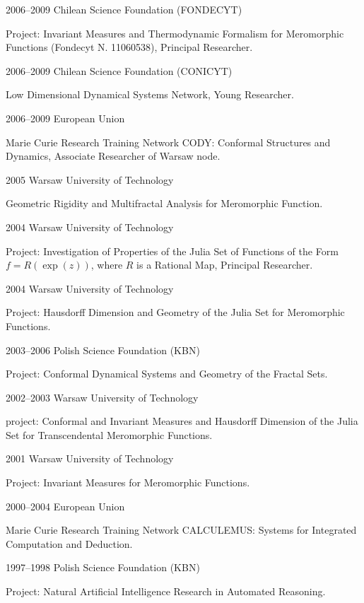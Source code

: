 \documentclass{article}
\begin{document}
\begin{CV}
\item[2006--2009] Chilean Science Foundation (FONDECYT) 

  Project: Invariant Measures and Thermodynamic Formalism for
  Meromorphic Functions (Fondecyt N. 11060538), Principal Researcher.
\item[2006--2009] Chilean Science Foundation (CONICYT) 

  Low Dimensional Dynamical Systems Network, Young Researcher.
\item[2006--2009] European Union

  Marie Curie Research Training Network CODY: Conformal Structures and
  Dynamics, Associate Researcher of Warsaw node.
\item[2005] Warsaw University of Technology

  Geometric Rigidity and Multifractal Analysis for Meromorphic
  Function.
\item[2004] Warsaw University of Technology

  Project: Investigation of Properties of the Julia Set of Functions
  of the Form $f=R(\exp(z))$, where $R$ is a Rational Map, Principal
  Researcher.
\item[2004] Warsaw University of Technology

  Project: Hausdorff Dimension and Geometry of the Julia Set for Meromorphic
  Functions.
\item[2003--2006] Polish Science Foundation (KBN)

  Project: Conformal Dynamical Systems and Geometry of the Fractal Sets.
\item[2002--2003] Warsaw University of Technology 

  project: Conformal and Invariant Measures and Hausdorff Dimension of the
  Julia Set for Transcendental Meromorphic Functions.
\item[2001] Warsaw University of Technology

  Project: Invariant Measures for Meromorphic Functions.
\item[2000--2004] European Union

  Marie Curie Research Training Network CALCULEMUS: Systems for
  Integrated Computation and Deduction.
\item[1997--1998] Polish Science Foundation (KBN)

  Project: Natural Artificial Intelligence Research in Automated
  Reasoning.
\end{CV}
\end{document}
